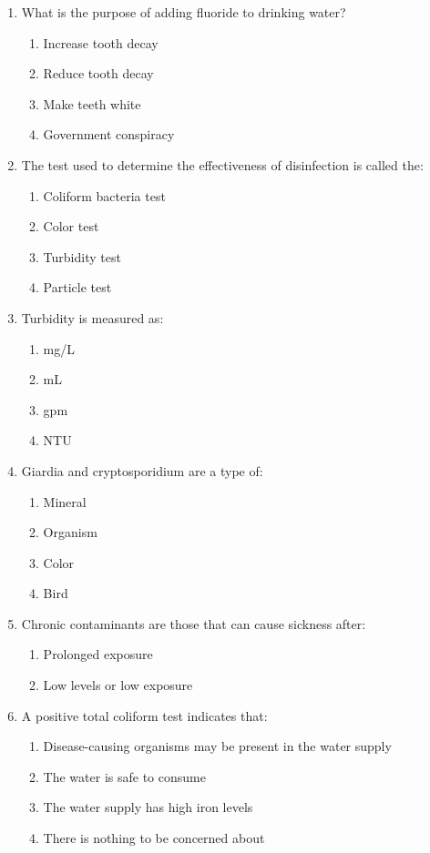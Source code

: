 \begin{enumerate}[1.]
\item What is the purpose of adding fluoride to drinking water?
\begin{enumerate}
\item Increase tooth decay
\item Reduce tooth decay
\item Make teeth white
\item Government conspiracy
\end{enumerate}

\item The test used to determine the effectiveness of disinfection is called the:
\begin{enumerate}
\item Coliform bacteria test
\item Color test
\item Turbidity test
\item Particle test
\end{enumerate}

\item Turbidity is measured as:
\begin{enumerate}
\item mg/L
\item mL
\item gpm
\item NTU
\end{enumerate}

\item Giardia and cryptosporidium are a type of:
\begin{enumerate}
\item Mineral
\item Organism
\item Color
\item Bird
\end{enumerate}

\item Chronic contaminants are those that can cause sickness after:
\begin{enumerate}
\item Prolonged exposure
\item Low levels or low exposure
\end{enumerate}

\item A positive total coliform test indicates that:
\begin{enumerate}
\item Disease-causing organisms may be present in the water supply
\item The water is safe to consume
\item The water supply has high iron levels
\item There is nothing to be concerned about
\end{enumerate}


\end{enumerate}
